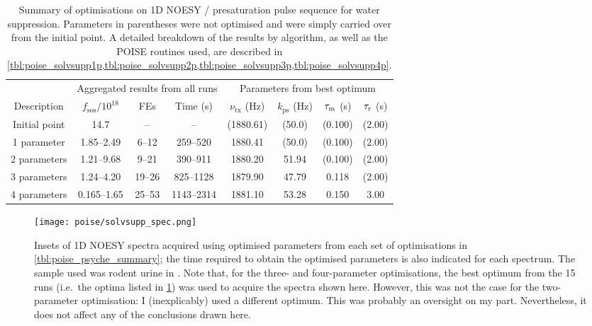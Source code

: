 \begin{table}
    \centering
    \begin{tabular}{cccccccc}
        \toprule
         & \multicolumn{3}{c}{Aggregated results from all runs} & \multicolumn{4}{c}{Parameters from best optimum} \\
        Description & $f_\mathrm{sos} / 10^{18}$ & FEs & Time (\unit{\s}) & $\nu_\text{tx}$ (\unit{\Hz}) & $k_\text{ps}$ (\unit{\Hz}) & $\tau_\mathrm{m}$ (\unit{\s}) & $\tau_\mathrm{r}$ (\unit{\s}) \\
        \hline
        Initial point & 14.7         & --     & --         & (1880.61) & (50.0) & (0.100) & (2.00) \\
        1 parameter   & 1.85--2.49   & 6--12  & 259--520   & 1880.41   & (50.0) & (0.100) & (2.00) \\
        2 parameters  & 1.21--9.68   & 9--21  & 390--911   & 1880.20   & 51.94  & (0.100) & (2.00) \\
        3 parameters  & 1.24--4.20   & 19--26 & 825--1128  & 1879.90   & 47.79  & 0.118   & (2.00) \\
        4 parameters  & 0.165--1.65  & 25--53 & 1143--2314 & 1881.10   & 53.28  & 0.150   & 3.00 \\
        \hline
    \end{tabular}
    \caption[Overview of all water suppression optimisations]{
        Summary of optimisations on 1D NOESY / presaturation pulse sequence for water suppression.
        Parameters in parentheses were not optimised and were simply carried over from the initial point.
        A detailed breakdown of the results by algorithm, as well as the POISE routines used, are described in \cref{tbl:poise_solvsupp1p,tbl:poise_solvsupp2p,tbl:poise_solvsupp3p,tbl:poise_solvsupp4p}.
    }
    \label{tbl:poise_solvsupp_summary}
\end{table}

\begin{figure}[htb]
    \centering
    \texttt{[image: poise/solvsupp\_spec.png]}
    \caption[1D NOESY spectra of rodent urine sample before and after optimisation]{
        Insets of 1D NOESY spectra acquired using optimised parameters from each set of optimisations in \cref{tbl:poise_psyche_summary}; the time required to obtain the optimised parameters is also indicated for each spectrum.
        The sample used was rodent urine in .
        Note that, for the three- and four-parameter optimisations, the best optimum from the 15 runs (i.e.\ the optima listed in \cref{tbl:poise_solvsupp_summary}) was used to acquire the spectra shown here.
        However, this was not the case for the two-parameter optimisation: I (inexplicably) used a different optimum.
        This was probably an oversight on my part.
        Nevertheless, it does not affect any of the conclusions drawn here.
    } \label{fig:poise_solvsupp_spec}
\end{figure}

